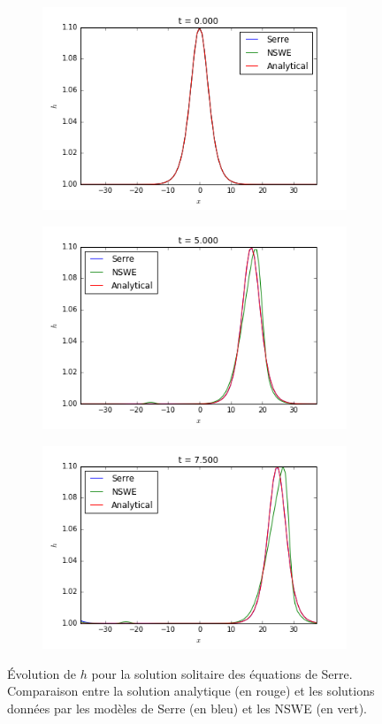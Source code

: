 \begin{figure}[h!]
	\begin{subfigure}{.3\linewidth}
		\includegraphics[scale=.3]{figures/Serre/4x4solitary1h.png}	
	\end{subfigure}
	\begin{subfigure}{.3\linewidth}
		\includegraphics[scale=.3]{figures/Serre/4x4solitary2h.png}	
	\end{subfigure}
	\begin{subfigure}{.3\linewidth}
		\includegraphics[scale=.3]{figures/Serre/4x4solitary3h.png}	
	\end{subfigure}
	\caption{Évolution de $h$ pour la solution solitaire des équations de Serre. Comparaison entre la solution analytique (en rouge) et les solutions données par les modèles de Serre (en bleu) et les NSWE (en vert). \label{fig:solitaryh}}
\end{figure}

